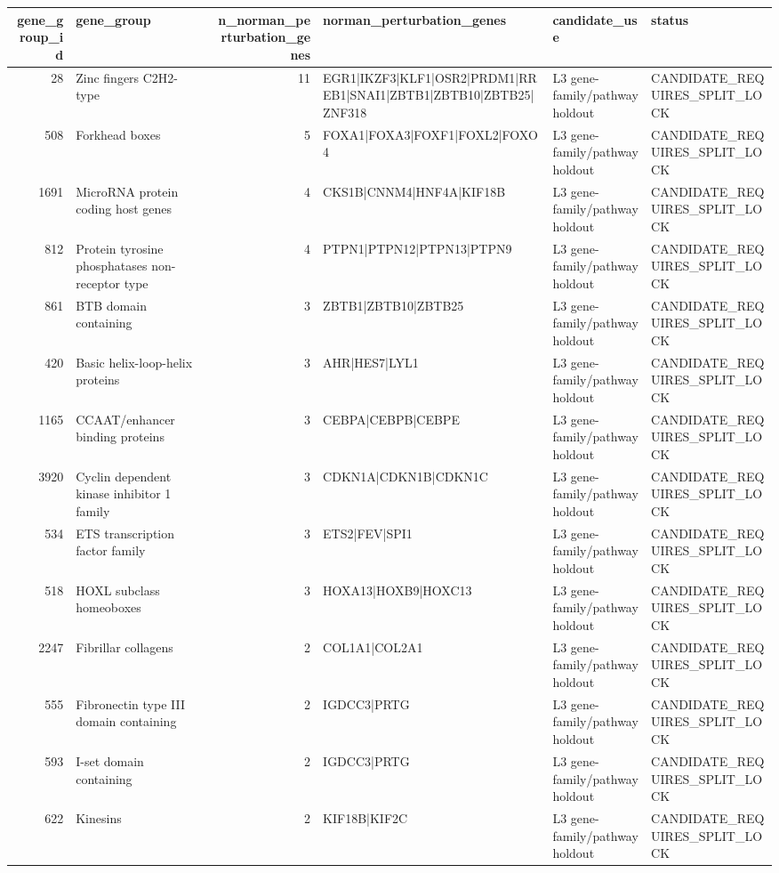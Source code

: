 \begin{tabular}{rlrlll}
\toprule
gene_group_id & gene_group & n_norman_perturbation_genes & norman_perturbation_genes & candidate_use & status \\
\midrule
28 & Zinc fingers C2H2-type & 11 & EGR1|IKZF3|KLF1|OSR2|PRDM1|RREB1|SNAI1|ZBTB1|ZBTB10|ZBTB25|ZNF318 & L3 gene-family/pathway holdout & CANDIDATE_REQUIRES_SPLIT_LOCK \\
508 & Forkhead boxes & 5 & FOXA1|FOXA3|FOXF1|FOXL2|FOXO4 & L3 gene-family/pathway holdout & CANDIDATE_REQUIRES_SPLIT_LOCK \\
1691 & MicroRNA protein coding host genes & 4 & CKS1B|CNNM4|HNF4A|KIF18B & L3 gene-family/pathway holdout & CANDIDATE_REQUIRES_SPLIT_LOCK \\
812 & Protein tyrosine phosphatases non-receptor type & 4 & PTPN1|PTPN12|PTPN13|PTPN9 & L3 gene-family/pathway holdout & CANDIDATE_REQUIRES_SPLIT_LOCK \\
861 & BTB domain containing & 3 & ZBTB1|ZBTB10|ZBTB25 & L3 gene-family/pathway holdout & CANDIDATE_REQUIRES_SPLIT_LOCK \\
420 & Basic helix-loop-helix proteins & 3 & AHR|HES7|LYL1 & L3 gene-family/pathway holdout & CANDIDATE_REQUIRES_SPLIT_LOCK \\
1165 & CCAAT/enhancer binding proteins & 3 & CEBPA|CEBPB|CEBPE & L3 gene-family/pathway holdout & CANDIDATE_REQUIRES_SPLIT_LOCK \\
3920 & Cyclin dependent kinase inhibitor 1 family & 3 & CDKN1A|CDKN1B|CDKN1C & L3 gene-family/pathway holdout & CANDIDATE_REQUIRES_SPLIT_LOCK \\
534 & ETS transcription factor family & 3 & ETS2|FEV|SPI1 & L3 gene-family/pathway holdout & CANDIDATE_REQUIRES_SPLIT_LOCK \\
518 & HOXL subclass homeoboxes & 3 & HOXA13|HOXB9|HOXC13 & L3 gene-family/pathway holdout & CANDIDATE_REQUIRES_SPLIT_LOCK \\
2247 & Fibrillar collagens & 2 & COL1A1|COL2A1 & L3 gene-family/pathway holdout & CANDIDATE_REQUIRES_SPLIT_LOCK \\
555 & Fibronectin type III domain containing & 2 & IGDCC3|PRTG & L3 gene-family/pathway holdout & CANDIDATE_REQUIRES_SPLIT_LOCK \\
593 & I-set domain containing & 2 & IGDCC3|PRTG & L3 gene-family/pathway holdout & CANDIDATE_REQUIRES_SPLIT_LOCK \\
622 & Kinesins & 2 & KIF18B|KIF2C & L3 gene-family/pathway holdout & CANDIDATE_REQUIRES_SPLIT_LOCK \\

\end{tabular}
